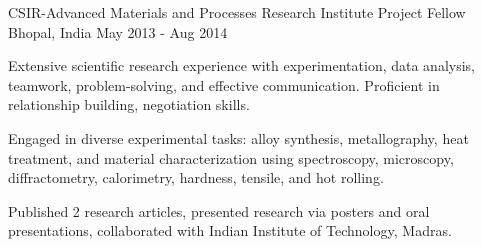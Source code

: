 \begin{cventries}
  \cventry
    {CSIR-Advanced Materials and Processes Research Institute} %
    {Project Fellow} %
    {Bhopal, India} %
    {May 2013 - Aug 2014} %
    {
      \begin{cvitems} %
        \item {Extensive scientific research experience with experimentation, data analysis, teamwork, problem-solving, and effective communication. Proficient in relationship building, negotiation skills.}
        \item {Engaged in diverse experimental tasks: alloy synthesis, metallography, heat treatment, and material characterization using spectroscopy, microscopy, diffractometry, calorimetry, hardness, tensile, and hot rolling.}
        \item {Published 2 research articles, presented research via posters and oral presentations, collaborated with Indian Institute of Technology, Madras.}
      \end{cvitems}
    }

\begin{comment}
\cventry
    {Department of Mechanical Enginering, Oriental Group of Institutions} %
    {Lecturer} %
    {Bhopal, India} %
    {Sep 2012 - May 2013} %
    {
      \begin{cvitems} %
        \item {Taught mechanical engineering subjects, covered materials science, machine component design, mechanics of materials, and basic concepts. Conducted laboratory activities for practical learning.}
        \item {Participated in ISTE workshop on Engineering Thermodynamics, gained skills in classification, problem-solving, and technical presentation.}
        \item {Positive student feedback, completed syllabus on time, promoted academic excellence, supported student improvement, established strong student relationships.}
        \item {\textbf{Technical Skills:} Teaching, Mechanical Engineering, Materials Science}
        \item {\textbf{Soft Skills:} Communication, Presentation, Time Management}
      \end{cvitems}
    }
\end{comment}
\end{cventries}
